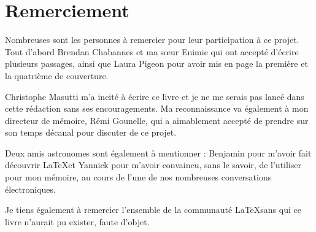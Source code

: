 \section*{Remerciement}\thispagestyle{plain}

Nombreuses sont les personnes à remercier pour leur participation à ce projet. Tout d'abord Brendan Chabannes et ma sœur Enimie qui ont accepté d'écrire plusieurs passages, ainsi que Laura Pigeon pour avoir mis en page la première et la quatrième de couverture.

Christophe Masutti m'a incité à écrire ce livre et je ne me serais pas lancé dans cette rédaction sans ses encouragements. Ma reconnaissance va également à mon directeur de mémoire, Rémi Gounelle, qui a aimablement accepté de prendre sur son temps décanal pour discuter de ce projet.

Deux amis astronomes sont également à mentionner : Benjamin pour m'avoir fait découvrir  \LaTeX et Yannick pour m'avoir convaincu, sans le savoir, de l'utiliser pour mon mémoire, au cours de l'une de nos nombreuses conversations électroniques.

Je tiens également à remercier l'ensemble de la communauté \LaTeX sans qui ce livre n'aurait pu exister, faute d'objet. 

